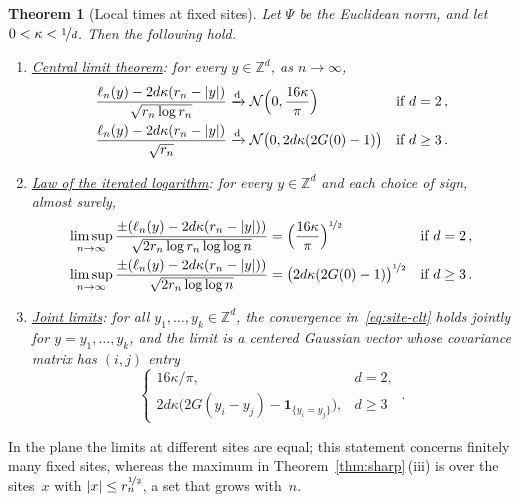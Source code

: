 \documentclass[11pt]{amsart}
\theoremstyle{plain}
\newtheorem{theorem}{Theorem}[section]
\theoremstyle{definition}
\newcommand{\Z}{\mathbb Z}
\newcommand{\drift}{\kappa}
\newcommand{\gauge}{\Psi}
\newcommand{\ind}{\mathbf 1}
\newcommand{\nf}{\nicefrac}
\numberwithin{equation}{section}
\begin{document}
\begin{theorem}[Local times at fixed sites]\label{thm:site-fluctuations}
Let $\gauge$ be the Euclidean norm, and let $0<\drift<\nf1d$. Then the following hold.
\begin{enumerate}[label=\textup{(\roman*)}]
\item \underline{\emph{Central limit theorem}}: for every $y\in\Z^d$, as $n\to\infty$,
\begin{equation}\label{eq:site-clt}
\begin{aligned}
\frac{\ell_n(y)-2d\drift(r_n-|y|)}{\sqrt{r_n\log r_n}}&\xrightarrow{\mathrm d}\mathcal N\Bigl(0,\frac{16\drift}{\pi}\Bigr)&&\text{if } d=2\, ,\\
\frac{\ell_n(y)-2d\drift(r_n-|y|)}{\sqrt{r_n}}&\xrightarrow{\mathrm d}\mathcal N\bigl(0,2d\drift(2G(0)-1)\bigr)&&\text{if } d\geq3\, .
\end{aligned}
\end{equation}
\item \underline{\emph{Law of the iterated logarithm}}: for every $y\in\Z^d$ and each choice of sign, almost surely,
\begin{equation*}
\begin{aligned}
\limsup_{n\to\infty}\frac{\pm(\ell_n(y)-2d\drift(r_n-|y|))}{\sqrt{2r_n\log r_n\log\log n}}&=\Bigl(\frac{16\drift}{\pi}\Bigr)^{\nf12}&&\text{if } d=2\, ,\\
\limsup_{n\to\infty}\frac{\pm(\ell_n(y)-2d\drift(r_n-|y|))}{\sqrt{2r_n\log\log n}}&=\bigl(2d\drift(2G(0)-1)\bigr)^{\nf12}&&\text{if } d\geq3\, .
\end{aligned}
\end{equation*}
\item \underline{\emph{Joint limits}}: for all $y_1,\ldots,y_k\in\Z^d$, the convergence in~\eqref{eq:site-clt} holds jointly for $y=y_1,\ldots,y_k$, and the limit is a centered Gaussian vector whose covariance matrix has $(i,j)$ entry
\begin{equation}\label{eq:site-covariance}
\begin{cases}
16\drift/\pi,&d=2,\\
2d\drift\bigl(2G(y_i-y_j)-\ind_{\{y_i=y_j\}}\bigr),&d\geq3
\end{cases}\, .
\end{equation}
\end{enumerate}
\end{theorem}

In the plane the limits at different sites are equal; this statement concerns finitely many fixed sites, whereas the maximum in Theorem~\ref{thm:sharp}\,(iii) is over the sites~$x$ with $|x|\leq r_n^{\nf12}$, a set that grows with~$n$.
\end{document}
